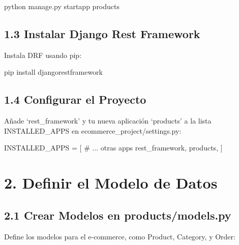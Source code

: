 \documentclass[
  a4paper,
  DIV=11,
  numbers=noendperiod,
  onepage,
  openany]{scrreprt}
\newenvironment{Shaded}{\begin{snugshade}}{\end{snugshade}}
\newcommand{\CommentTok}[1]{\textcolor[rgb]{0.37,0.37,0.37}{#1}}
\newcommand{\ExtensionTok}[1]{\textcolor[rgb]{0.00,0.23,0.31}{#1}}
\newcommand{\NormalTok}[1]{\textcolor[rgb]{0.00,0.23,0.31}{#1}}
\newcommand{\OperatorTok}[1]{\textcolor[rgb]{0.37,0.37,0.37}{#1}}
\newcommand{\StringTok}[1]{\textcolor[rgb]{0.13,0.47,0.30}{#1}}
\begin{document}
\begin{Shaded}
\begin{Highlighting}[]
\ExtensionTok{python}\NormalTok{ manage.py startapp products}
\end{Highlighting}
\end{Shaded}

\subsection{1.3 Instalar Django Rest
Framework}\label{instalar-django-rest-framework}

Instala DRF usando pip:

\begin{Shaded}
\begin{Highlighting}[]
\ExtensionTok{pip}\NormalTok{ install djangorestframework}
\end{Highlighting}
\end{Shaded}

\subsection{1.4 Configurar el Proyecto}\label{configurar-el-proyecto}

Añade `rest\_framework' y tu nueva aplicación `products' a la lista
INSTALLED\_APPS en ecommerce\_project/settings.py:

\begin{Shaded}
\begin{Highlighting}[]
\NormalTok{INSTALLED\_APPS }\OperatorTok{=}\NormalTok{ [}
    \CommentTok{\# ... otras apps}
    \StringTok{\textquotesingle{}rest\_framework\textquotesingle{}}\NormalTok{,}
    \StringTok{\textquotesingle{}products\textquotesingle{}}\NormalTok{,}
\NormalTok{]}
\end{Highlighting}
\end{Shaded}

\section{2. Definir el Modelo de
Datos}\label{definir-el-modelo-de-datos}

\subsection{2.1 Crear Modelos en
products/models.py}\label{crear-modelos-en-productsmodels.py}

Define los modelos para el e-commerce, como Product, Category, y Order:
\end{document}
